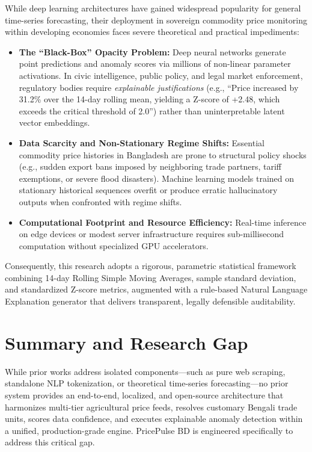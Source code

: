 While deep learning architectures have gained widespread popularity for general time-series forecasting, their deployment in sovereign commodity price monitoring within developing economies faces severe theoretical and practical impediments:
\begin{itemize}
    \item \textbf{The ``Black-Box'' Opacity Problem:} Deep neural networks generate point predictions and anomaly scores via millions of non-linear parameter activations. In civic intelligence, public policy, and legal market enforcement, regulatory bodies require \textit{explainable justifications} (e.g., ``Price increased by 31.2\% over the 14-day rolling mean, yielding a Z-score of +2.48, which exceeds the critical threshold of 2.0'') rather than uninterpretable latent vector embeddings.
    \item \textbf{Data Scarcity and Non-Stationary Regime Shifts:} Essential commodity price histories in Bangladesh are prone to structural policy shocks (e.g., sudden export bans imposed by neighboring trade partners, tariff exemptions, or severe flood disasters). Machine learning models trained on stationary historical sequences overfit or produce erratic hallucinatory outputs when confronted with regime shifts.
    \item \textbf{Computational Footprint and Resource Efficiency:} Real-time inference on edge devices or modest server infrastructure requires sub-millisecond computation without specialized GPU accelerators.
\end{itemize}

Consequently, this research adopts a rigorous, parametric statistical framework combining 14-day Rolling Simple Moving Averages, sample standard deviation, and standardized Z-score metrics, augmented with a rule-based Natural Language Explanation generator that delivers transparent, legally defensible auditability.

\section{Summary and Research Gap}
While prior works address isolated components—such as pure web scraping, standalone NLP tokenization, or theoretical time-series forecasting—no prior system provides an end-to-end, localized, and open-source architecture that harmonizes multi-tier agricultural price feeds, resolves customary Bengali trade units, scores data confidence, and executes explainable anomaly detection within a unified, production-grade engine. PricePulse BD is engineered specifically to address this critical gap.
